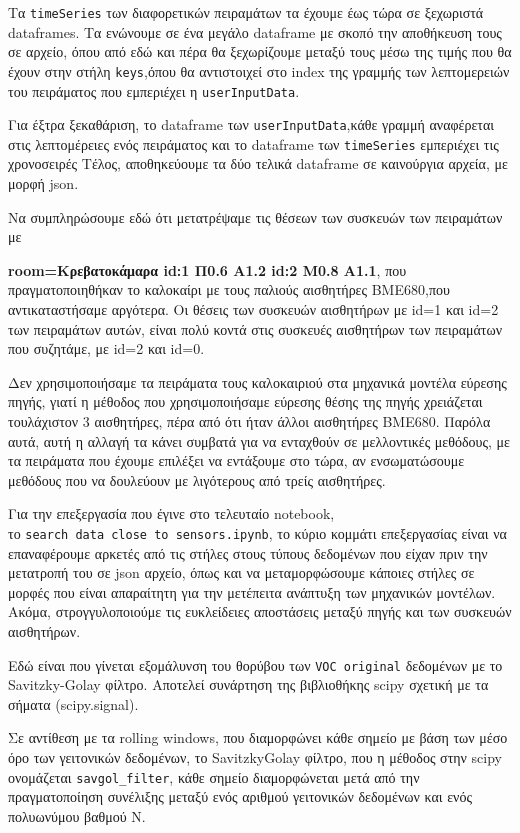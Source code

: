 Τα \texttt{timeSeries} των διαφορετικών πειραμάτων τα έχουμε έως τώρα σε ξεχωριστά dataframes.
Τα ενώνουμε σε ένα μεγάλο dataframe με σκοπό την αποθήκευση τους σε αρχείο, όπου από εδώ και πέρα θα 
ξεχωρίζουμε μεταξύ τους μέσω της τιμής που θα έχουν στην στήλη \texttt{keys},όπου θα αντιστοιχεί
στο index της γραμμής των λεπτομερειών του πειράματος που εμπεριέχει η \texttt{userInputData}.

Για έξτρα ξεκαθάριση, το dataframe των \texttt{userInputData},κάθε γραμμή αναφέρεται στις λεπτομέρειες ενός πειράματος
και το dataframe των \texttt{timeSeries} εμπεριέχει τις χρονοσειρές
Τέλος, αποθηκεύουμε τα δύο τελικά dataframe σε καινούργια αρχεία, με μορφή json.

Να συμπληρώσουμε εδώ ότι μετατρέψαμε τις θέσεων των συσκευών των πειραμάτων με 

\textbf{room=Κρεβατοκάμαρα id:1 Π0.6 A1.2 id:2 M0.8 A1.1},
που πραγματοποιηθήκαν το καλοκαίρι με τους 
παλιούς αισθητήρες BME680,που αντικαταστήσαμε αργότερα.
Οι θέσεις των συσκευών αισθητήρων με id=1 και id=2 των πειραμάτων αυτών,
είναι πολύ κοντά στις συσκευές αισθητήρων των πειραμάτων που συζητάμε, με id=2 και id=0.

Δεν χρησιμοποιήσαμε τα πειράματα τους καλοκαιριού στα μηχανικά μοντέλα εύρεσης πηγής, γιατί η μέθοδος που χρησιμοποιήσαμε 
εύρεσης θέσης της πηγής χρειάζεται τουλάχιστον 3 αισθητήρες, πέρα από ότι ήταν άλλοι αισθητήρες BME680.
Παρόλα αυτά, αυτή η αλλαγή τα κάνει συμβατά για να ενταχθούν σε μελλοντικές μεθόδους,
με τα πειράματα που έχουμε επιλέξει να εντάξουμε στο τώρα, αν ενσωματώσουμε μεθόδους που να δουλεύουν με λιγότερους
από τρείς αισθητήρες.


Για την επεξεργασία που έγινε στο τελευταίο notebook,\\
το \texttt{search data close to sensors.ipynb},
το κύριο κομμάτι επεξεργασίας είναι να επαναφέρουμε αρκετές από τις στήλες στους τύπους δεδομένων που είχαν πριν την μετατροπή του σε json αρχείο,
όπως και να μεταμορφώσουμε κάποιες στήλες σε μορφές που είναι απαραίτητη για την μετέπειτα ανάπτυξη των μηχανικών μοντέλων.
Ακόμα, στρογγυλοποιούμε τις ευκλείδειες αποστάσεις μεταξύ πηγής και των συσκευών αισθητήρων.

Εδώ είναι που γίνεται εξομάλυνση του θορύβου των \texttt{VOC original} δεδομένων με το Savitzky-Golay φίλτρο.
Αποτελεί συνάρτηση της βιβλιοθήκης scipy σχετική με τα σήματα (scipy.signal).

Σε αντίθεση με τα rolling windows, που διαμορφώνει κάθε σημείο με βάση των μέσο όρο των γειτονικών δεδομένων,
το Savitzky\-Golay φίλτρο, που η μέθοδος στην scipy ονομάζεται \texttt{savgol\_filter},
κάθε σημείο διαμορφώνεται μετά από την πραγματοποίηση συνέλιξης μεταξύ ενός αριθμού γειτονικών δεδομένων 
και ενός πολυωνύμου βαθμού N.

